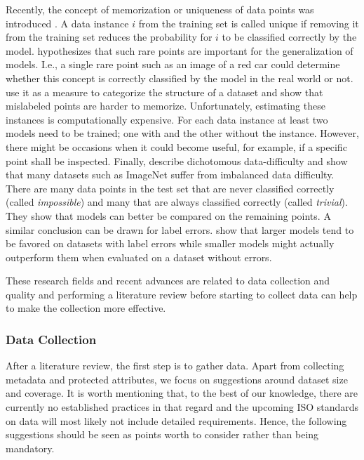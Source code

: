 Recently, the concept of memorization or uniqueness of data points was introduced \citep{Feldman2020_LongTail, Jiang2020_CharacterizingRegularities}.  A data instance $i$ from the training set is called unique if removing it from the training set reduces the probability for $i$ to be classified correctly by the model. \cite{Feldman2020_LongTail} hypothesizes that such rare points are important for the generalization of models. I.e., a single rare point such as an image of a red car could determine whether this concept is correctly classified by the model in the real world or not. 
\citet{Jiang2020_CharacterizingRegularities} use it as a measure to categorize the structure of a dataset and show that mislabeled points are harder to memorize. Unfortunately, estimating these instances is computationally expensive. For each data instance at least two models need to be trained; one with and the other without the instance. However, there might be occasions when it could become useful, for example, if a specific point shall be inspected. 
Finally, \citet{Meding2021_DDD} describe dichotomous data-difficulty and show that many datasets such as ImageNet suffer from imbalanced data difficulty. There are many data points in the test set that are never classified correctly (called \emph{impossible}) and many that are always classified correctly (called \emph{trivial}). They show that models can better be compared on the remaining points.  A similar conclusion can be drawn for label errors. \cite{Northcutt2021_LabelErrors} show that larger models tend to be favored on datasets with label errors while smaller models might actually outperform them when evaluated on a dataset without errors.

These research fields and recent advances are related to data collection and quality and performing a literature review before starting to collect data can help to make the collection more effective. 


\subsubsection{Data Collection}
\label{subsec:data_collection}
After a literature review, the first step is to gather data. Apart from collecting metadata and protected attributes, we focus on suggestions around dataset size and coverage. It is worth mentioning that, to the best of our knowledge, there are currently no established practices in that regard and the upcoming ISO standards on data \cite{ISO5259} will most likely not include detailed requirements. Hence, the following suggestions should be seen as points worth to consider rather than being mandatory. 


